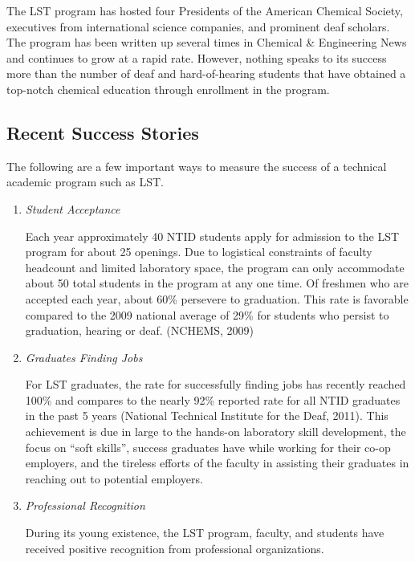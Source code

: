 \documentclass[11.5pt]{sig-alternate} %
\begin{document}
\begin{large}
The LST program has hosted four Presidents of the American Chemical Society, executives from international science companies, and prominent deaf scholars. The program has been written up several times in Chemical \& Engineering News and continues to grow at a rapid rate. However, nothing speaks to its success more than the number of deaf and hard-of-hearing students that have obtained a top-notch chemical education through enrollment in the program.

\subsection*{Recent Success Stories}
The following are a few important ways to measure the success of a technical academic program such as LST.
\begin{enumerate}[label=\Alph*)]
    \item \textit{Student Acceptance}
    \begin{sloppypar}Each year approximately 40 NTID students apply for admission to the LST program for about 25 openings. Due to logistical constraints of faculty headcount and limited laboratory space, the program can only accommodate about 50 total students in the program at any one time. Of freshmen who are accepted each year, about 60\% persevere to graduation. This rate is favorable compared to the 2009 national average of 29\% for students who persist to graduation, hearing or deaf. (NCHEMS, 2009)\end{sloppypar}
    \item \textit{Graduates Finding Jobs}
    \begin{sloppypar}For LST graduates, the rate for successfully finding jobs has recently reached 100\% and compares to the nearly 92\% reported rate for all NTID graduates in the past 5 years (National Technical Institute for the Deaf, 2011). This achievement is due in large to the hands-on laboratory skill development, the focus on “soft skills”, success graduates have while working for their co-op employers, and the tireless efforts of the faculty in assisting their graduates in reaching out to potential employers.\end{sloppypar}
    \item \textit{Professional Recognition}
    \begin{sloppypar}During its young existence, the LST program, faculty, and students have received positive recognition from professional organizations.\end{sloppypar}
    \begin{enumerate}

\end{enumerate}
\end{enumerate}
\end{large}
\end{document}
